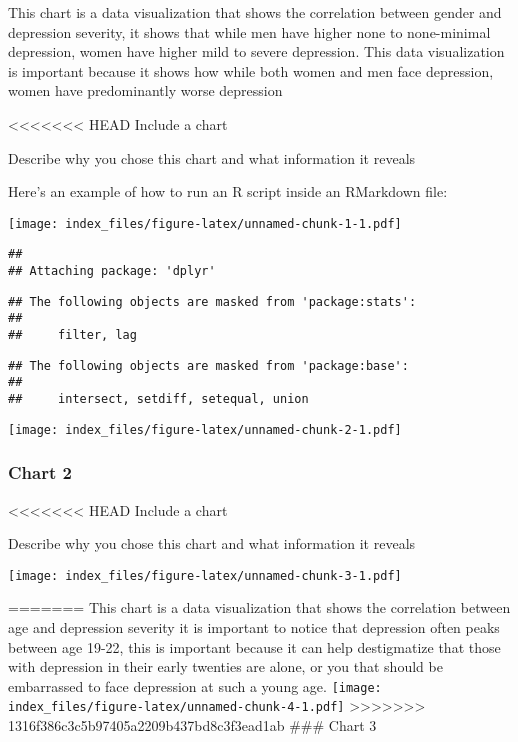 \documentclass[
]{article}
\begin{document}
This chart is a data visualization that shows the correlation between
gender and depression severity, it shows that while men have higher none
to none-minimal depression, women have higher mild to severe depression.
This data visualization is important because it shows how while both
women and men face depression, women have predominantly worse depression

\textless\textless\textless\textless\textless\textless\textless{} HEAD
Include a chart

Describe why you chose this chart and what information it reveals

Here's an example of how to run an R script inside an RMarkdown file:

\texttt{[image: index\_files/figure-latex/unnamed-chunk-1-1.pdf]}

\begin{verbatim}
## 
## Attaching package: 'dplyr'
\end{verbatim}

\begin{verbatim}
## The following objects are masked from 'package:stats':
## 
##     filter, lag
\end{verbatim}

\begin{verbatim}
## The following objects are masked from 'package:base':
## 
##     intersect, setdiff, setequal, union
\end{verbatim}

\texttt{[image: index\_files/figure-latex/unnamed-chunk-2-1.pdf]}

\hypertarget{chart-2}{%
\subsubsection{Chart 2}\label{chart-2}}

\textless\textless\textless\textless\textless\textless\textless{} HEAD
Include a chart

Describe why you chose this chart and what information it reveals

\texttt{[image: index\_files/figure-latex/unnamed-chunk-3-1.pdf]}

======= This chart is a data visualization that shows the correlation
between age and depression severity it is important to notice that
depression often peaks between age 19-22, this is important because it
can help destigmatize that those with depression in their early twenties
are alone, or you that should be embarrassed to face depression at such
a young age.
\texttt{[image: index\_files/figure-latex/unnamed-chunk-4-1.pdf]}
\textgreater\textgreater\textgreater\textgreater\textgreater\textgreater\textgreater{}
1316f386c3c5b97405a2209b437bd8c3f3ead1ab \#\#\# Chart 3
\end{document}
